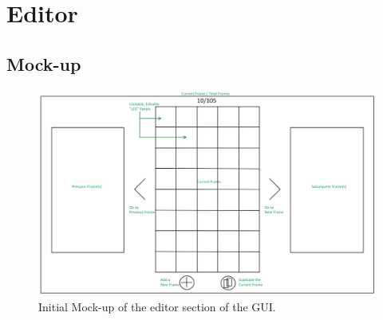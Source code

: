 
\usepackage{graphicx}


	\section{Editor}
	
	\subsection{Mock-up}
	\begin{figure}[!htb]
		\includegraphics[width=\linewidth]{../mockups/editor_view.jpg}
		\caption{Initial Mock-up of the editor section of the GUI.}
		\label{fig:editor_view}
	\end{figure}
	
